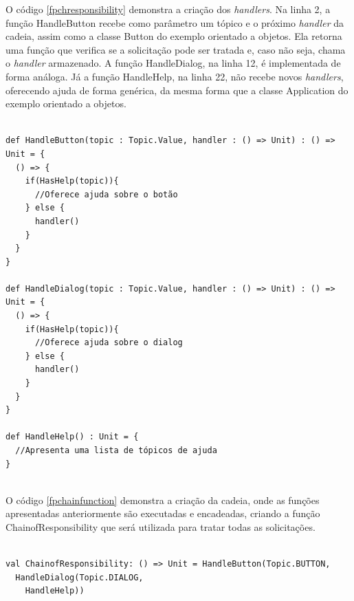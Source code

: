 O código \ref{fpchresponsibility} demonstra a 
criação dos \textit{handlers}. Na linha 2, a 
função HandleButton recebe como parâmetro um 
tópico e o próximo \textit{handler} da cadeia, 
assim como a classe Button do exemplo orientado 
a objetos. Ela retorna uma função que verifica 
se a solicitação pode ser tratada e, caso 
não seja, chama o \textit{handler} armazenado. 
A função HandleDialog, na linha 12, é 
implementada de forma análoga. Já a função 
HandleHelp, na linha 22, não recebe novos 
\textit{handlers}, oferecendo ajuda de forma 
genérica, da mesma forma que a classe 
Application do exemplo orientado a objetos.

\begin{lstlisting}[caption={Chain of Responsibility Funcional},label=fpchresponsibility]
    
def HandleButton(topic : Topic.Value, handler : () => Unit) : () => Unit = {
  () => {
    if(HasHelp(topic)){
      //Oferece ajuda sobre o botão
    } else {
      handler()
    }
  }
}

def HandleDialog(topic : Topic.Value, handler : () => Unit) : () => Unit = {
  () => {
    if(HasHelp(topic)){
      //Oferece ajuda sobre o dialog
    } else {
      handler()
    }
  }
}

def HandleHelp() : Unit = {
  //Apresenta uma lista de tópicos de ajuda
}
    
\end{lstlisting}

O código \ref{fpchainfunction} demonstra a criação 
da cadeia, onde as funções apresentadas anteriormente 
são executadas e encadeadas, criando a função 
ChainofResponsibility que será utilizada para 
tratar todas as solicitações.

\begin{lstlisting}[caption={Função Chain of Responsability},label=fpchainfunction]
    
val ChainofResponsibility: () => Unit = HandleButton(Topic.BUTTON,
  HandleDialog(Topic.DIALOG,
    HandleHelp))
      
\end{lstlisting}